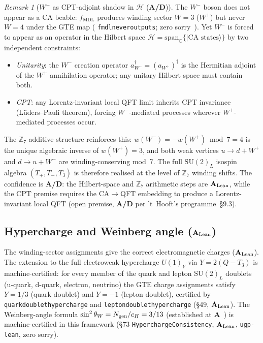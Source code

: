 \documentclass[11pt]{article}
\theoremstyle{remark}
\newtheorem{remark}[theorem]{Remark}
\newcommand{\MDL}{\text{MDL}}
\newcommand{\lean}[1]{%
  \penalty-100
  \begingroup\def\_{\textunderscore\allowbreak}\texttt{#1}\endgroup}
\newcommand{\CatA}{\textbf{A}}
\newcommand{\CatAL}{\ensuremath{\textbf{A}_{\rm Lean}}}
\newcommand{\CatAD}{\textbf{A/D}}
\newcommand{\ket}[1]{|{#1}\rangle}
\begin{document}
\begin{remark}[$W^-$ as CPT-adjoint shadow in $\mathcal{H}$ (\CatAD{})]
\label{rem:wminus_cpt_shadow}
The $W^-$ boson does not appear as a CA beable: $f_{\MDL}$ produces
winding sector $W=3$ ($W^+$) but never $W=4$ under the GTE map
(\lean{fmdl\_never\_outputs\_4}; zero sorry~\cite{SpivackCompUniversality}).
Yet $W^-$ is forced to appear as an operator in the Hilbert space
$\mathcal{H} = \mathrm{span}_{\mathbb{C}}\{\ket{\text{CA states}}\}$
by two independent constraints:
\begin{itemize}[leftmargin=2em]
  \item \emph{Unitarity}: the $W^-$ creation operator
    $a^\dagger_{W^-} = (a_{W^+})^\dagger$ is the Hermitian adjoint of
    the $W^+$ annihilation operator; any unitary Hilbert space must
    contain both.
  \item \emph{CPT}: any Lorentz-invariant local QFT limit inherits
    CPT invariance (L\"{u}ders--Pauli theorem), forcing $W^-$-mediated
    processes wherever $W^+$-mediated processes occur.
\end{itemize}
The $\mathbb{Z}_7$ additive structure reinforces this:
$w(W^-) = -w(W^+) \bmod 7 = 4$ is the unique algebraic inverse of
$w(W^+)=3$, and both weak vertices $u\to d+W^+$ and $d\to u+W^-$
are winding-conserving mod~7.  The full $\mathrm{SU}(2)_L$ isospin
algebra $(T_+, T_-, T_3)$ is therefore realised at the level of
$\mathbb{Z}_7$ winding shifts.  The confidence is \CatAD{}: the
Hilbert-space and $\mathbb{Z}_7$ arithmetic steps are \CatAL{}, while
the CPT premise requires the CA$\to$QFT embedding to produce a
Lorentz-invariant local QFT (open premise, \CatAD{} per 't~Hooft's
programme~\S9.3).
\end{remark}

\subsection{Hypercharge and Weinberg angle (\CatAL{})}
\label{ssec:hypercharge}

The winding-sector assignments give the correct electromagnetic charges (\CatAL{}).
The extension to the full electroweak hypercharge $U(1)_Y$ via $Y = 2(Q - T_3)$
is machine-certified: for every member of the quark and lepton $\mathrm{SU}(2)_L$
doublets (u-quark, d-quark, electron, neutrino) the GTE charge assignments
satisfy $Y = 1/3$ (quark doublet) and $Y = -1$ (lepton doublet),
certified by \lean{quark\_doublet\_hypercharge} and \lean{lepton\_doublet\_hypercharge}
(\S49, \CatAL{}).
The Weinberg-angle formula $\sin^2\theta_W = N_{\rm gen}/c_H = 3/13$
(established at \CatA{}~\cite{SpivackWeinbergAngle}) is machine-certified
in this framework (\S73 \lean{HyperchargeConsistency}, \CatAL{}, \texttt{ugp-lean},
zero sorry).
\end{document}

